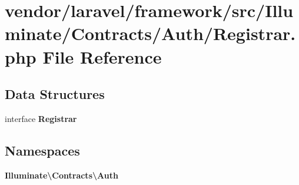 \section{vendor/laravel/framework/src/\+Illuminate/\+Contracts/\+Auth/\+Registrar.php File Reference}
\label{vendor_2laravel_2framework_2src_2_illuminate_2_contracts_2_auth_2_registrar_8php}
\subsection*{Data Structures}
\begin{DoxyCompactItemize}
\item 
interface {\bf Registrar}
\end{DoxyCompactItemize}
\subsection*{Namespaces}
\begin{DoxyCompactItemize}
\item 
 {\bf Illuminate\textbackslash{}\+Contracts\textbackslash{}\+Auth}
\end{DoxyCompactItemize}
